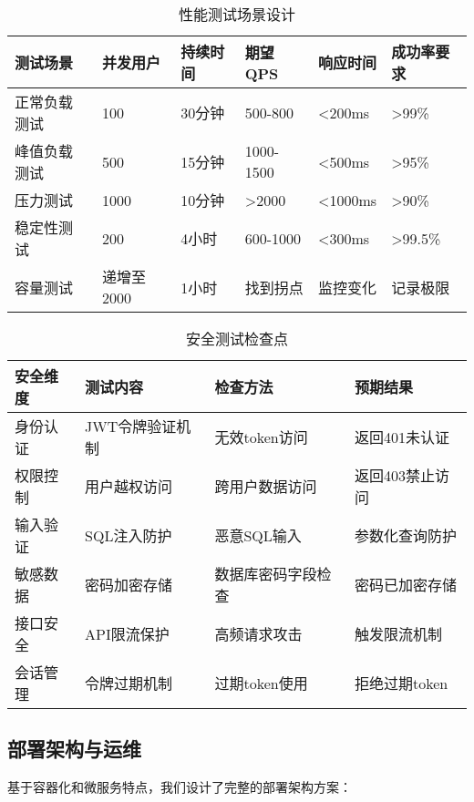\documentclass[a4paper,12pt]{article}
\begin{document}
\begin{table}[H]
\centering
\caption{性能测试场景设计}
\begin{tabular}{|p{2.5cm}|p{2cm}|p{2cm}|p{2cm}|p{2cm}|p{3cm}|}
\hline
\textbf{测试场景} & \textbf{并发用户} & \textbf{持续时间} & \textbf{期望QPS} & \textbf{响应时间} & \textbf{成功率要求} \\
\hline
正常负载测试 & 100 & 30分钟 & 500-800 & <200ms & >99\% \\
\hline
峰值负载测试 & 500 & 15分钟 & 1000-1500 & <500ms & >95\% \\
\hline
压力测试 & 1000 & 10分钟 & >2000 & <1000ms & >90\% \\
\hline
稳定性测试 & 200 & 4小时 & 600-1000 & <300ms & >99.5\% \\
\hline
容量测试 & 递增至2000 & 1小时 & 找到拐点 & 监控变化 & 记录极限 \\
\hline
\end{tabular}
\end{table}

\begin{table}[H]
\centering
\caption{安全测试检查点}
\begin{tabular}{|p{2.5cm}|p{4cm}|p{3cm}|p{3.5cm}|}
\hline
\textbf{安全维度} & \textbf{测试内容} & \textbf{检查方法} & \textbf{预期结果} \\
\hline
身份认证 & JWT令牌验证机制 & 无效token访问 & 返回401未认证 \\
\hline
权限控制 & 用户越权访问 & 跨用户数据访问 & 返回403禁止访问 \\
\hline
输入验证 & SQL注入防护 & 恶意SQL输入 & 参数化查询防护 \\
\hline
敏感数据 & 密码加密存储 & 数据库密码字段检查 & 密码已加密存储 \\
\hline
接口安全 & API限流保护 & 高频请求攻击 & 触发限流机制 \\
\hline
会话管理 & 令牌过期机制 & 过期token使用 & 拒绝过期token \\
\hline
\end{tabular}
\end{table}

\subsection{部署架构与运维}

基于容器化和微服务特点，我们设计了完整的部署架构方案：
\end{document}
